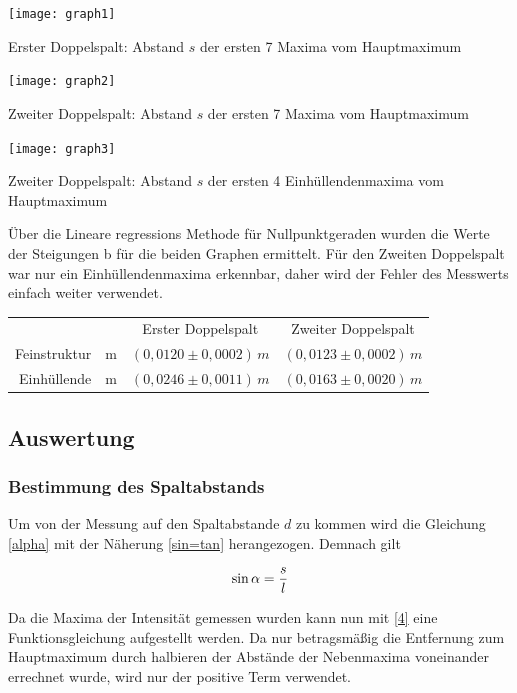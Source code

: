 \documentclass{article}
\begin{document}
\begin{center}
\texttt{[image: graph1]}

Erster Doppelspalt: Abstand \(s\) der ersten 7 Maxima vom Hauptmaximum
\end{center}

\begin{center}
\texttt{[image: graph2]}

Zweiter Doppelspalt: Abstand \(s\) der ersten 7 Maxima vom Hauptmaximum
\end{center}

\begin{center}
\texttt{[image: graph3]}

Zweiter Doppelspalt: Abstand \(s\) der ersten 4 Einhüllendenmaxima vom Hauptmaximum
\end{center}

\noindent
Über die Lineare regressions Methode für Nullpunktgeraden wurden die Werte der Steigungen b für die beiden Graphen ermittelt. Für den Zweiten Doppelspalt war nur ein Einhüllendenmaxima erkennbar, daher wird der Fehler des Messwerts einfach weiter verwendet.
\begin{center}
\begin{tabular}{r c c c}
		& & Erster Doppelspalt & Zweiter Doppelspalt \\
	Feinstruktur & m	& \( (0,0120 \pm 0,0002)\,m \) 	& \( (0,0123 \pm 0,0002)\,m \) \\
	Einhüllende & m	& \( (0,0246 \pm 0,0011)\,m \) 	& \( (0,0163 \pm 0,0020)\,m \)

\end{tabular}
\end{center}

\subsection{Auswertung}
\subsubsection{Bestimmung des Spaltabstands}
Um von der Messung auf den Spaltabstande \(d\) zu kommen wird die Gleichung \eqref{alpha} mit der Näherung \eqref{sin=tan} herangezogen. Demnach gilt

\begin{equation}
\sin \alpha = \frac{s}{l}
\notag
\end{equation}

Da die Maxima der Intensität gemessen wurden kann nun mit \eqref{4} eine Funktionsgleichung aufgestellt werden. Da nur betragsmäßig die Entfernung zum Hauptmaximum durch halbieren der Abstände der Nebenmaxima voneinander errechnet wurde, wird nur der positive Term verwendet.
\end{document}
